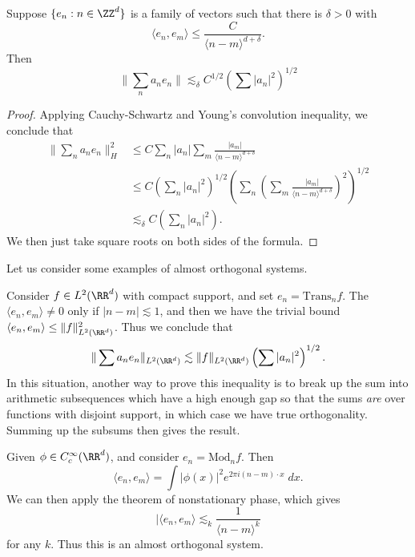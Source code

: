 \begin{lemma}
  Suppose $\{ e_n : n \in \ZZ^d \}$ is a family of vectors such that there is $\delta > 0$ with
  \[ \langle e_n, e_m \rangle \leq \frac{C}{\langle n - m \rangle^{d + \delta}}. \]
  Then
  \[ \| \sum_n a_n e_n \| \lesssim_\delta C^{1/2} \left( \sum |a_n|^2 \right)^{1/2} \]
\end{lemma}
\begin{proof}
  Applying Cauchy-Schwartz and Young's convolution inequality, we conclude that
  \begin{align*}
    \| \sum_n a_n e_n \|_H^2 &\leq C \sum_n |a_n| \sum_m \frac{|a_m|}{\langle n - m \rangle^{d + \delta}}\\
    &\leq C \left( \sum_n |a_n|^2 \right)^{1/2} \left( \sum_n \left( \sum_m \frac{|a_m|}{\langle n - m \rangle^{d + \delta}} \right)^2 \right)^{1/2}\\
    &\lesssim_\delta C \left( \sum_n |a_n|^2 \right).
  \end{align*}
  We then just take square roots on both sides of the formula.
\end{proof}

Let us consider some examples of almost orthogonal systems.

\begin{example}
  Consider $f \in L^2(\RR^d)$ with compact support, and set $e_n = \text{Trans}_n f$. The $\langle e_n, e_m \rangle \neq 0$ only if $|n - m| \lesssim 1$, and then we have the trivial bound $\langle e_n, e_m \rangle \leq \| f \|_{L^2(\RR^d)}^2$. Thus we conclude that
  \[ \| \sum a_n e_n \|_{L^2(\RR^d)} \lesssim \| f \|_{L^2(\RR^d)} \left( \sum |a_n|^2 \right)^{1/2}. \]
  In this situation, another way to prove this inequality is to break up the sum into arithmetic subsequences which have a high enough gap so that the sums \emph{are} over functions with disjoint support, in which case we have true orthogonality. Summing up the subsums then gives the result.
\end{example}

\begin{example}
  Given $\phi \in C_c^\infty(\RR^d)$, and consider $e_n = \text{Mod}_n f$. Then
  \[ \langle e_n, e_m \rangle = \int |\phi(x)|^2 e^{2 \pi i (n - m) \cdot x}\; dx. \]
  We can then apply the theorem of nonstationary phase, which gives
  \[ |\langle e_n, e_m \rangle \lesssim_k \frac{1}{\langle n - m \rangle^k} \]
  for any $k$. Thus this is an almost orthogonal system.
\end{example}

